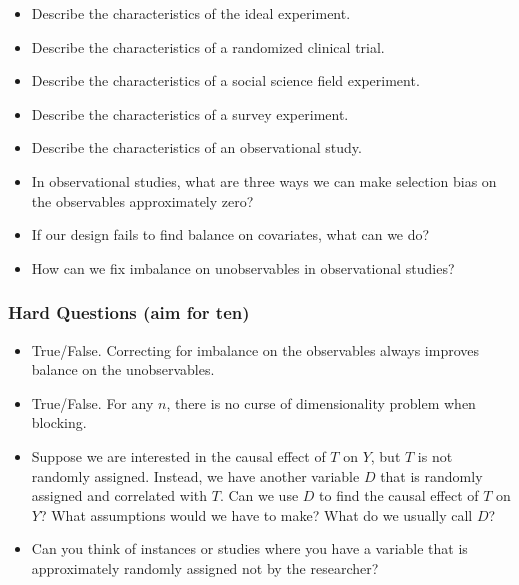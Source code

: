 \documentclass[11pt]{article}
\begin{document}
\begin{itemize}

\item Describe the characteristics of the ideal experiment.

\item Describe the characteristics of a randomized clinical trial.

\item Describe the characteristics of a social science field experiment.

\item Describe the characteristics of a survey experiment.

\item Describe the characteristics of an observational study.

\item In observational studies, what are three ways we can make selection bias on the observables approximately zero?

\item If our design fails to find balance on covariates, what can we do?

\item How can we fix imbalance on unobservables in observational studies?

\end{itemize}

\subsubsection{Hard Questions (aim for ten)}


\begin{itemize}
\item True/False.  Correcting for imbalance on the observables always improves balance on the unobservables.

\item True/False.  For any $n$, there is no curse of dimensionality problem when blocking.

\item Suppose we are interested in the causal effect of $T$ on $Y$, but $T$ is not randomly assigned.  Instead, we have another variable $D$ that is randomly assigned and correlated with $T$.  Can we use $D$ to find the causal effect of $T$ on $Y$?  What assumptions would we have to make?  What do we usually call $D$?

\item Can you think of instances or studies where you have a variable that is approximately randomly assigned not by the researcher?


\end{itemize}
\end{document}
